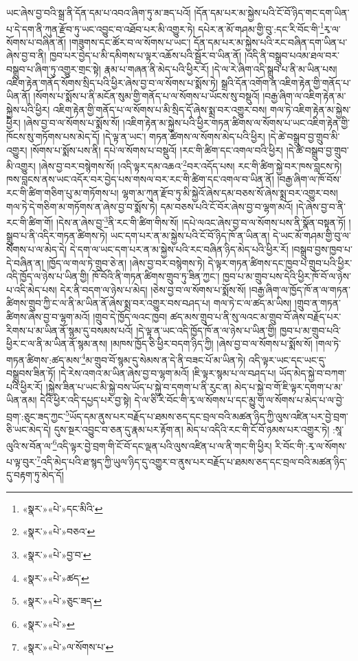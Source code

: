 ཡང་ཞེས་བྱ་བའི་སྒྲ་ནི་དོན་དམ་པ་འབའ་ཞིག་ཏུ་མ་ཟད་པའོ། །དོན་དམ་པར་མ་སྐྱེས་པའི་ངོ་བོ་ཉིད་གང་དག་ཡིན་པ་དེ་དག་ནི་ཀུན་རྫོབ་ཏུ་ཡང་འབྱུང་བ་འཐོབ་པར་མི་འགྱུར་ཏེ། དཔེར་ན་མོ་གཤམ་གྱི་བུ་:དང་རི་བོང་གི་\footnote{«སྣར་»«པེ་»དང་མིའི་}རྭ་ལ་སོགས་པ་བཞིན་ནོ། །གཟུགས་དང་ཚོར་བ་ལ་སོགས་པ་ཡང་། དོན་དམ་པར་མ་སྐྱེས་པའི་རང་བཞིན་དག་ཡིན་པ་ཞེས་བྱ་བ་ནི། ཁྱབ་པར་བྱེད་པ་མི་དམིགས་པ་ལྟར་འཆོས་པའི་སྦྱོར་བ་ཡིན་ནོ། །འདི་ནི་བསྒྲུབ་པའམ་ཐལ་བར་བསྒྲུབ་པ་ཞིག་ཏུ་འགྱུར་གྲང་སྟེ། རྣམ་པ་གཞན་ནི་མེད་པའི་ཕྱིར་རོ། །དེ་ལ་རེ་ཞིག་འདི་སྒྲུབ་པ་ནི་མ་ཡིན་པས། འཇིག་རྟེན་གནོད་སོགས་སྲིད་པའི་ཕྱིར་ཞེས་བྱ་བ་ལ་སོགས་པ་སྨོས་ཏེ། སྒྲའི་དོན་འགོག་ན་འཇིག་རྟེན་གྱི་གནོད་པ་ཡིན་ནོ། །སོགས་པ་སྨོས་པ་ནི་མངོན་སུམ་གྱི་གནོད་པ་ལ་སོགས་པ་ཡོངས་སུ་བསྡུའོ། །བརྒྱ་ཞིག་ལ་འཇིག་རྟེན་མ་སྐྱེས་པའི་ཕྱིར། འཇིག་རྟེན་གྱི་གནོད་པ་ལ་སོགས་པ་མི་སྲིད་དོ་ཞེས་སྨྲ་བར་འགྱུར་བས། གལ་ཏེ་འཇིག་རྟེན་མ་སྐྱེས་ཕྱིར། །ཞེས་བྱ་བ་ལ་སོགས་པ་སྨོས་སོ། །འཇིག་རྟེན་མ་སྐྱེས་པའི་ཕྱིར་གཏན་ཚིགས་ལ་སོགས་པ་ཡང་འཇིག་རྟེན་གྱི་ཁོངས་སུ་གཏོགས་པས་མེད་དོ། །དེ་ལྟ་ན་ཡང་། གཏན་ཚིགས་ལ་སོགས་མེད་པའི་ཕྱིར། །དེ་ཚེ་བསྒྲུབ་བྱ་གྲུབ་མི་འགྱུར། །སོགས་པ་སྨོས་པས་ནི། དཔེ་ལ་སོགས་པ་བསྡུའོ། །རང་གི་ཚིག་དང་འགལ་བའི་ཕྱིར། །དེ་ཚེ་བསྒྲུབ་བྱ་གྲུབ་མི་འགྱུར། །ཞེས་བྱ་བར་བསྙེགས་སོ། །འདི་ལྟར་དམ་འཆའ་\footnote{«སྣར་»«པེ་»བཅའ་}བར་འདོད་པས། རང་གི་ཚིག་སྐྱེ་བར་ཁས་བླངས་ཏེ། ཁས་བླངས་ནས་ཡང་འདོར་བར་བྱེད་པས་གསལ་བར་རང་གི་ཚིག་དང་འགལ་བ་ཡིན་ནོ། །བརྒྱ་ཞིག་ལ་ཁོ་བོས་རང་གི་ཚིག་གཅིག་པུ་མ་གཏོགས་པ། ལྷག་མ་ཀུན་རྫོབ་ཏུ་མི་སྐྱེའོ་ཞེས་དམ་བཅས་སོ་ཞེས་སྨྲ་བར་འགྱུར་བས། གལ་ཏེ་དེ་གཅིག་མ་གཏོགས་ན་ཞེས་བྱ་བ་སྨོས་ཏེ། དམ་བཅས་པའི་ངོ་བོར་ཞེས་བྱ་བ་ལྷག་མའོ། །དེ་ཞེས་བྱ་བ་ནི་རང་གི་ཚིག་གོ། །དེས་ན་ཞེས་བྱ་\footnote{«སྣར་»«པེ་»བྱ་བ་}ནི་རང་གི་ཚིག་གིས་སོ། །དཔེ་ལའང་ཞེས་བྱ་བ་ལ་སོགས་པས་ནི་སྣོན་བསྟན་ཏོ། །སྒྲུབ་པ་ནི་འདིར་གཏན་ཚིགས་ཏེ། ཡང་དག་པར་ན་མ་སྐྱེས་པའི་ངོ་བོ་ཉིད་ཁོ་ན་ཡིན་ན། དེ་ཡང་མོ་གཤམ་གྱི་བུ་ལ་སོགས་པ་ལ་མེད་དེ། དེ་དག་ལ་ཡང་དག་པར་ན་མ་སྐྱེས་པའི་རང་བཞིན་ཉིད་མེད་པའི་ཕྱིར་རོ། །བསྒྲུབ་བྱས་ཁྱབ་པ་དེ་བཞིན་ན། །ཁྱོད་ལ་གལ་ཏེ་གྲུབ་ཅེ་ན། །ཞེས་བྱ་བར་བསྙེགས་ཏེ། དེ་ལྟར་གཏན་ཚིགས་དང་ཁྱབ་པ་གྲུབ་པའི་ཕྱིར་འདི་ཁྱོད་ལ་ཉེས་པ་ཡིན་གྱི། ཁོ་བོའི་ནི་གཏན་ཚིགས་གྲུབ་ཏུ་ཟིན་ཀྱང་། ཁྱབ་པ་མ་གྲུབ་པས་དེའི་ཕྱིར་ཁོ་བོ་ལ་ཉེས་པ་འདི་མེད་པས། དེར་ནི་བདག་ལ་ཉེས་པ་མེད། །ཅེས་བྱ་བ་ལ་སོགས་པ་སྨོས་སོ། །བརྒྱ་ཞིག་ལ་ཁྱོད་ཁོ་ན་ལ་གཏན་ཚིགས་གྲུབ་ཀྱི་ང་ལ་ནི་མ་ཡིན་ནོ་ཞེས་སྨྲ་བར་འགྱུར་བས་བཤད་པ། གལ་ཏེ་ང་ལ་ཚད་མ་ཡིས། །གྲུབ་ན་གཏན་ཚིགས་ཞེས་བྱ་བ་ལྷག་མའོ། །གྲུབ་དེ་ཁྱོད་ལའང་ཁྱབ། ཚད་མས་གྲུབ་པ་ནི་སུ་ལའང་མ་གྲུབ་བོ་ཞེས་བརྗོད་པར་རིགས་པ་མ་ཡིན་ནོ་སྙམ་དུ་བསམས་པའོ། །དེ་ལྟ་ན་ཡང་འདི་ཁྱོད་ཁོ་ན་ལ་ཉེས་པ་ཡིན་གྱི། ཁྱབ་པ་མ་གྲུབ་པའི་ཕྱིར་ང་ལ་ནི་མ་ཡིན་ནོ་སྙམ་ནས། །མཁས་ཁྱོད་ཅི་ཕྱིར་བདག་ཉིད་ཀྱི། །ཞེས་བྱ་བ་ལ་སོགས་པ་སྨོས་སོ། །གལ་ཏེ་གཏན་ཚིགས་:ཚད་མས་\footnote{«སྣར་»«པེ་»ཚད་}མ་གྲུབ་བོ་སྙམ་དུ་སེམས་ན་དེ་ནི་བཟང་པོ་མ་ཡིན་ཏེ། འདི་ལྟར་ཡང་དང་ཡང་དུ་བསྒྲུབས་ཟིན་ཏོ། །དེ་རེས་འགའ་མ་ཡིན་ཞེས་བྱ་བ་ལྷག་མའོ། །ཇི་ལྟར་སྙམ་པ་ལ་བཤད་པ། ཡོད་མེད་སྐྱེ་བ་བཀག་པའི་ཕྱིར་རོ། །སྐྱེས་ཟིན་པ་ཡང་མི་སྐྱེ་བས་ཡོད་པ་སྐྱེ་བ་དགག་པ་ནི་རུང་ན། མེད་པ་སྐྱེ་བ་གོ་ཇི་ལྟར་དགག་པ་མ་ཡིན་ནམ། དེའི་ཕྱིར་འདི་དཔྱད་པར་བྱ་སྟེ། དེ་ལ་ཅི་རི་བོང་གི་རྭ་ལ་སོགས་པ་དང་མྱུ་གུ་ལ་སོགས་པ་མེད་པ་ལ་བྱེ་བྲག་:ཅུང་ཟད་ཀྱང་\footnote{«སྣར་»«པེ་»ཅུང་ཟད་}ཡོད་དམ་ནུས་པར་བརྗོད་པ་ཐམས་ཅད་དང་བྲལ་བའི་མཚན་ཉིད་ཀྱི་ལུས་འཛིན་པར་བྱེ་བྲག་ཅི་ཡང་མེད་དེ། དུས་སྔར་འབྱུང་བ་ཅན་དུ་རྣམ་པར་རྟོག་ན། མེད་པ་འདིའི་རང་གི་ངོ་བོ་ཉམས་པར་འགྱུར་ཏེ། :སཱ་ལུའི་ས་བོན་ལ་\footnote{«སྣར་»«པེ་»}འདི་ལྟར་བྱེ་བྲག་གི་ངོ་བོ་དང་ལྡན་པའི་ལུས་འཛིན་པ་ལ་ནི་གང་གི་ཕྱིར། རི་བོང་གི་:རྭ་ལ་སོགས་པ་ལྟ་བུར་\footnote{«སྣར་»«པེ་»ལ་སོགས་པ་}འདི་མེད་པའི་ཐ་སྙད་ཀྱི་ཡུལ་ཉིད་དུ་འགྱུར་བ་ནུས་པར་བརྗོད་པ་ཐམས་ཅད་དང་བྲལ་བའི་མཚན་ཉིད་དུ་བརྟག་ཏུ་མེད་དོ། 